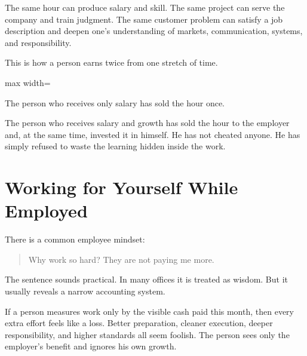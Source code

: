 The same hour can produce salary and skill. The same project can serve the company and train judgment. The same customer problem can satisfy a job description and deepen one's understanding of markets, communication, systems, and responsibility.

This is how a person earns twice from one stretch of time.

\begin{center}
\begin{adjustbox}{max width=\linewidth}
\end{adjustbox}
\end{center}

The person who receives only salary has sold the hour once.

The person who receives salary and growth has sold the hour to the employer and, at the same time, invested it in himself. He has not cheated anyone. He has simply refused to waste the learning hidden inside the work.

\section*{Working for Yourself While Employed}

There is a common employee mindset:

\begin{quote}
Why work so hard? They are not paying me more.
\end{quote}

The sentence sounds practical. In many offices it is treated as wisdom. But it usually reveals a narrow accounting system.

If a person measures work only by the visible cash paid this month, then every extra effort feels like a loss. Better preparation, cleaner execution, deeper responsibility, and higher standards all seem foolish. The person sees only the employer's benefit and ignores his own growth.

